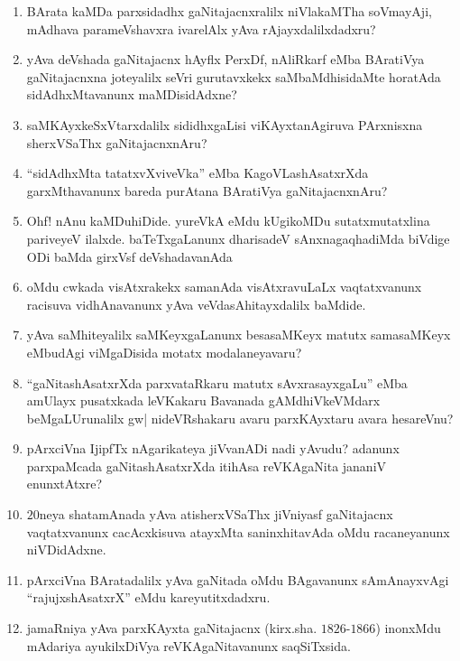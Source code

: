 \begin{enumerate}
\item BArata kaMDa parxsidadhx gaNitajacnxralilx niVlakaMTha soVmayAji, mAdhava parameVshavxra ivarelAlx yAva rAjayxdalilxdadxru?
  
\item yAva deVshada gaNitajacnx hAyflx PerxDf, nAliRkarf eMba BAratiVya gaNitajacnxna joteyalilx seVri gurutavxkekx saMbaMdhisidaMte horatAda sidAdhxMtavanunx maMDisidAdxne?
  
\item saMKAyxkeSxVtarxdalilx sididhxgaLisi viKAyxtanAgiruva PArxnisxna sherxVSaThx gaNitajacnxnAru?
  
\item ``sidAdhxMta tatatxvXviveVka'' eMba KagoVLashAsatxrXda garxMthavanunx bareda purAtana BAratiVya gaNitajacnxnAru?
  
\item Ohf! nAnu kaMDuhiDide. yureVkA eMdu kUgikoMDu sutatxmutatxlina pariveyeV ilalxde. baTeTxgaLanunx dharisadeV sAnxnagaqhadiMda  biVdige ODi baMda girxVsf deVshadavanAda
  
\item oMdu cwkada visAtxrakekx samanAda visAtxravuLaLx vaqtatxvanunx racisuva vidhAnavanunx yAva veVdasAhitayxdalilx baMdide.
  
  \eject
  
\item yAva saMhiteyalilx saMKeyxgaLanunx besasaMKeyx matutx samasaMKeyx eMbudAgi viMgaDisida motatx modalaneyavaru?
  
\item ``gaNitashAsatxrXda parxvataRkaru matutx sAvxrasayxgaLu'' eMba amUlayx pusatxkada leVKakaru Bavanada gAMdhiVkeVMdarx beMgaLUrunalilx gw| nideVRshakaru avaru parxKAyxtaru avara hesareVnu?

\item pArxciVna IjipfTx nAgarikateya jiVvanADi nadi yAvudu? adanunx parxpaMcada gaNitashAsatxrXda itihAsa reVKAgaNita jananiV enunxtAtxre?
  
\item $20$neya shatamAnada yAva atisherxVSaThx jiVniyasf gaNitajacnx vaqtatxvanunx cacAcxkisuva atayxMta saninxhitavAda oMdu racaneyanunx niVDidAdxne.
  
\item pArxciVna BAratadalilx yAva gaNitada oMdu BAgavanunx sAmAnayxvAgi ``rajujxshAsatxrX'' eMdu kareyutitxdadxru.
  
\item jamaRniya yAva parxKAyxta gaNitajacnx (kirx.sha. $1826$-$1866$) inonxMdu mAdariya ayukilxDiVya reVKAgaNitavanunx saqSiTxsida.
  

\end{enumerate}
